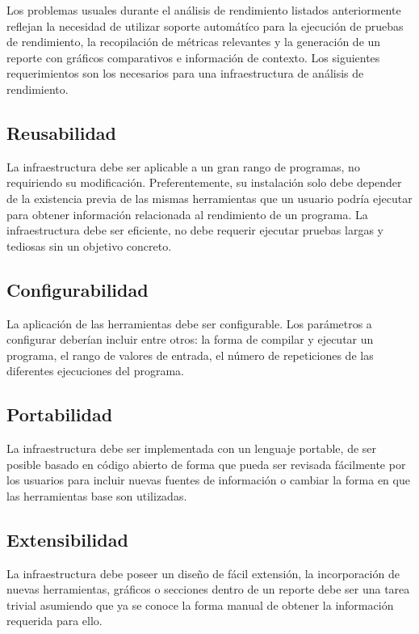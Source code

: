 \documentclass[a4paper]{report}
\begin{document}
Los problemas usuales durante el análisis de rendimiento listados anteriormente reflejan la necesidad de utilizar soporte automátíco para la ejecución de pruebas de rendimiento, la recopilación de métricas relevantes y la generación de un reporte con gráficos comparativos e información de contexto. Los siguientes requerimientos son los necesarios para una infraestructura de análisis de rendimiento.

\subsection*{Reusabilidad}

La infraestructura debe ser aplicable a un gran rango de programas, no requiriendo su modificación.
Preferentemente, su instalación solo debe depender de la existencia previa de las mismas herramientas que un usuario podría ejecutar para obtener información relacionada al rendimiento de un programa. La infraestructura debe ser eficiente, no debe requerir ejecutar pruebas largas y tediosas sin un objetivo concreto.

\subsection*{Configurabilidad}

La aplicación de las herramientas debe ser configurable.
Los parámetros a configurar deberían incluir entre otros: la forma de compilar y ejecutar un programa, el rango de valores de entrada, el número de repeticiones de las diferentes ejecuciones del programa.

\subsection*{Portabilidad}

La infraestructura debe ser implementada con un lenguaje portable, de ser posible basado en código abierto de forma que pueda ser revisada fácilmente por los usuarios para incluir nuevas fuentes de información o cambiar la forma en que las herramientas base son utilizadas.

\subsection*{Extensibilidad}

La infraestructura debe poseer un diseño de fácil extensión, la incorporación de nuevas herramientas, gráficos o secciones dentro de un reporte debe ser una tarea trivial asumiendo que ya se conoce la forma manual de obtener la información requerida para ello.
\end{document}
